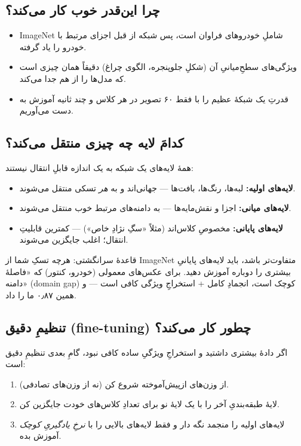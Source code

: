 \documentclass[12pt,a4paper]{article}
\begin{document}
\subsection{چرا این‌قدر خوب کار می‌کند؟}

\begin{itemize}
  \item ImageNet شاملِ خودروهای فراوان است، پس شبکه از قبل اجزای مرتبط با خودرو را یاد گرفته.
  \item ویژگی‌های سطحِ‌میانیِ آن (شکلِ جلوپنجره، الگوی چراغ) دقیقاً همان چیزی است که مدل‌ها را از هم جدا می‌کند.
  \item قدرتِ یک شبکهٔ عظیم را با فقط ۶۰ تصویر در هر کلاس و چند ثانیه آموزش به دست می‌آوریم.
\end{itemize}

\subsection{کدامَ لایه چه چیزی منتقل می‌کند؟}

همهٔ لایه‌های یک شبکه به یک اندازه قابلِ انتقال نیستند:

\begin{itemize}
  \item \textbf{لایه‌های اولیه:} لبه‌ها، رنگ‌ها، بافت‌ها — جهانی‌اند و به \emph{هر} تسکی منتقل می‌شوند.
  \item \textbf{لایه‌های میانی:} اجزا و نقش‌مایه‌ها — به دامنه‌های مرتبط خوب منتقل می‌شوند.
  \item \textbf{لایه‌های پایانی:} مخصوصِ کلاس‌اند (مثلاً «سگِ نژادِ خاص») — کمترین قابلیتِ انتقال؛ اغلب جایگزین می‌شوند.
\end{itemize}

\begin{riyazi}
قاعدهٔ سرانگشتی: هرچه تسکِ شما از ImageNet متفاوت‌تر باشد، باید لایه‌های پایانیِ بیشتری را دوباره آموزش دهید. برای عکس‌های معمولی (خودرو، کنتور) که «فاصلهٔ دامنه» (domain gap) کوچک است، انجمادِ کامل + استخراجِ ویژگی کافی است — و همین ۰٫۸۷ ما را داد.
\end{riyazi}

\subsection{تنظیمِ دقیق (fine-tuning) چطور کار می‌کند؟}

اگر دادهٔ بیشتری داشتید و استخراجِ ویژگیِ ساده کافی نبود، گامِ بعدی تنظیمِ دقیق است:

\begin{enumerate}
  \item از وزن‌های از‌پیش‌آموخته شروع کن (نه از وزن‌های تصادفی).
  \item لایهٔ طبقه‌بندیِ آخر را با یک لایهٔ نو برای تعدادِ کلاس‌های خودت جایگزین کن.
  \item لایه‌های اولیه را منجمد نگه دار و فقط لایه‌های بالایی را با \emph{نرخِ یادگیریِ کوچک} آموزش بده.
\end{enumerate}
\end{document}
